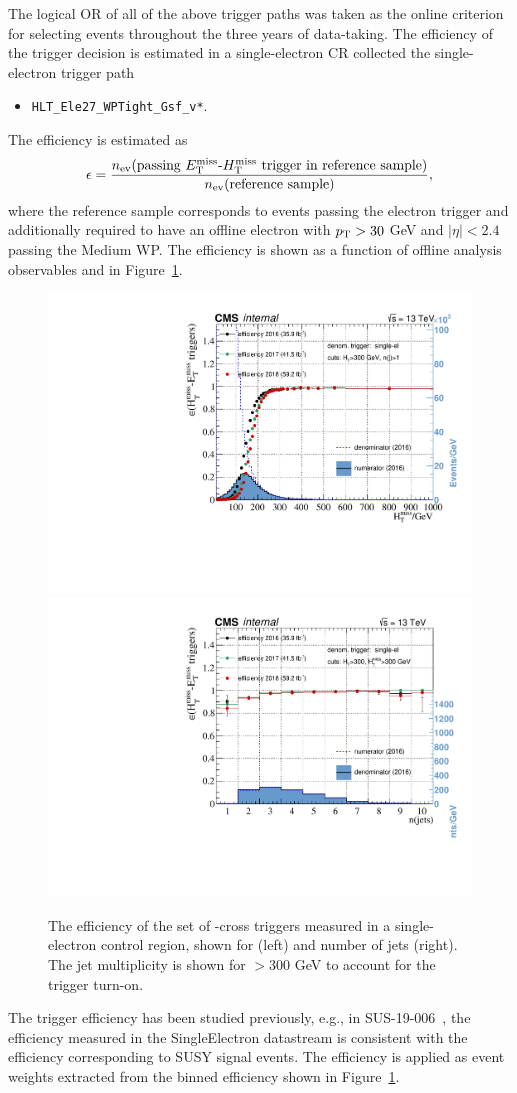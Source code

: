 The logical OR of all of the above trigger paths was taken as the online criterion for selecting events throughout the three years of
data-taking.  The efficiency of the trigger decision is estimated in a single-electron CR collected the single-electron trigger path
\begin{itemize}
\item \texttt{HLT\_Ele27\_WPTight\_Gsf\_v*}.
\end{itemize}
The efficiency is estimated as
\begin{equation}
\epsilon = \frac{ n_{\text{ev}}(\text{passing \MET-\mht trigger in reference sample}) }{n_{\text{ev}}(\text{reference sample})},
\end{equation}
where the reference sample corresponds to events passing the electron trigger and additionally required to have an offline electron with $p_{\mathrm{T}}>30$ GeV and $|\eta|<2.4$ passing the Medium WP. The efficiency is shown as a function of offline analysis observables \mht and \njets in Figure~\ref{fig:main-trigger-real-met}.

\begin{figure}[]
\centering
\includegraphics[width=0.48\linewidth]{plots/trigger/TrigEffMht.pdf}
\includegraphics[width=0.48\linewidth]{plots/trigger/TrigEffNJets.pdf}
\caption{The efficiency of the set of \MET-\mht cross triggers measured in a single-electron control region, shown for \mht (left) and number of jets (right). The jet multiplicity is shown for \mht$>300$ GeV to account for the trigger turn-on.
  }
\label{fig:main-trigger-real-met}
\end{figure}

The trigger efficiency has been studied previously, e.g., in SUS-19-006~\cite{CMS-PAS-SUS-19-006}, the efficiency measured in the SingleElectron datastream is consistent with the efficiency corresponding to SUSY signal events. The efficiency is applied as event weights extracted from the binned efficiency shown in Figure~\ref{fig:main-trigger-real-met}.



